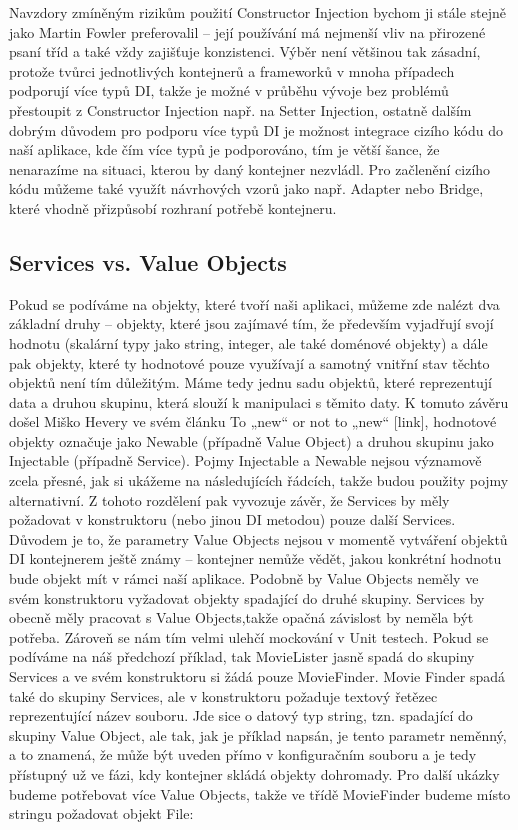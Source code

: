 \documentclass[a4paper,conference]{IEEEtran}
\begin{document}
Navzdory zmíněným rizikům použití Constructor Injection bychom ji stále stejně jako Martin Fowler preferovalil – její používání má nejmenší vliv na přirozené psaní tříd a také vždy zajišťuje konzistenci. Výběr není většinou tak zásadní, protože tvůrci jednotlivých kontejnerů a frameworků v mnoha případech podporují více typů DI, takže je možné v průběhu vývoje bez problémů přestoupit z Constructor Injection např. na Setter Injection, ostatně dalším dobrým důvodem pro podporu více typů DI je možnost integrace cizího kódu do naší aplikace, kde čím více typů je podporováno, tím je větší šance, že nenarazíme na situaci, kterou by daný kontejner nezvládl. Pro začlenění cizího kódu můžeme také využít návrhových vzorů jako např. Adapter nebo Bridge, které vhodně přizpůsobí rozhraní potřebě kontejneru.

\subsection{Services vs. Value Objects}

Pokud se podíváme na objekty, které tvoří naši aplikaci, můžeme zde nalézt dva základní druhy – objekty, které jsou zajímavé tím, že především vyjadřují svojí hodnotu (skalární typy jako string, integer, ale také doménové objekty) a dále pak objekty, které ty hodnotové pouze využívají a samotný vnitřní stav těchto objektů není tím důležitým. Máme tedy jednu sadu objektů, které reprezentují data a druhou skupinu, která slouží k manipulaci s těmito daty. K tomuto závěru došel Miško Hevery ve svém článku To „new“ or not to „new“ [link], hodnotové objekty označuje jako Newable (případně Value Object) a druhou skupinu jako Injectable (případně Service). Pojmy Injectable a Newable nejsou významově zcela přesné, jak si ukážeme na následujících řádcích, takže budou použity pojmy alternativní. Z tohoto rozdělení pak vyvozuje závěr, že Services by měly požadovat v konstruktoru (nebo jinou DI metodou) pouze další Services. Důvodem je to, že parametry Value Objects nejsou v momentě vytváření objektů DI kontejnerem ještě známy – kontejner nemůže vědět, jakou konkrétní hodnotu bude objekt mít v rámci naší aplikace. Podobně by Value Objects neměly ve svém konstruktoru vyžadovat objekty spadající do druhé skupiny. Services by obecně měly pracovat s Value Objects,takže opačná závislost by neměla být potřeba. Zároveň se nám tím velmi ulehčí mockování v Unit testech.
Pokud se podíváme na náš předchozí příklad, tak MovieLister jasně spadá do skupiny Services a ve svém konstruktoru si žádá pouze MovieFinder. Movie Finder spadá také do skupiny Services, ale v konstruktoru požaduje textový řetězec reprezentující název souboru. Jde sice o datový typ string, tzn. spadající do skupiny Value Object, ale tak, jak je příklad napsán, je tento parametr neměnný, a to znamená, že může být uveden přímo v konfiguračním souboru a je tedy přístupný už ve fázi, kdy kontejner skládá objekty dohromady.
Pro další ukázky budeme potřebovat více Value Objects, takže ve třídě MovieFinder budeme místo stringu požadovat objekt File:
\end{document}
